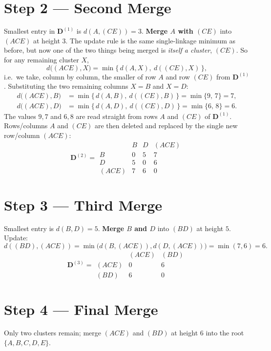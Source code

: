 \documentclass[11pt,a4paper]{report}
\theoremstyle{definition}
\theoremstyle{plain}
\theoremstyle{remark}
\begin{document}
\section{Step 2 --- Second Merge}
Smallest entry in $\mathbf D^{(1)}$ is $d(A,(CE))=3$. \textbf{Merge $A$ with
$(CE)$} into $(ACE)$ at height $3$. The update rule is the same single-linkage
minimum as before, but now one of the two things being merged is \emph{itself a
cluster}, $(CE)$. So for any remaining cluster $X$,
\[
d\bigl((ACE),X\bigr)=\min\bigl\{\,d(A,X),\ d((CE),X)\,\bigr\},
\]
i.e.\ we take, column by column, the smaller of row $A$ and row $(CE)$ from
$\mathbf D^{(1)}$. Substituting the two remaining columns $X=B$ and $X=D$:
\[
\begin{aligned}
d\bigl((ACE),B\bigr)&=\min\bigl\{\,d(A,B),\ d((CE),B)\,\bigr\}=\min\{9,\,7\}=7,\\[2pt]
d\bigl((ACE),D\bigr)&=\min\bigl\{\,d(A,D),\ d((CE),D)\,\bigr\}=\min\{6,\,8\}=6.
\end{aligned}
\]
The values $9,7$ and $6,8$ are read straight from rows $A$ and $(CE)$ of
$\mathbf D^{(1)}$. Rows/columns $A$ and $(CE)$ are then deleted and replaced by
the single new row/column $(ACE)$:
\begin{equation}
\mathbf{D}^{(2)}=
\begin{array}{c|ccc}
     & B & D & (ACE)\\ \hline
B    & 0 & 5 & 7\\
D    & 5 & 0 & 6\\
(ACE)& 7 & 6 & 0
\end{array}
\end{equation}

\section{Step 3 --- Third Merge}
Smallest entry is $d(B,D)=5$. \textbf{Merge $B$ and $D$} into $(BD)$ at height
$5$. Update:
\[
d((BD),(ACE))=\min\bigl(d(B,(ACE)),d(D,(ACE))\bigr)=\min(7,6)=6.
\]
\begin{equation}
\mathbf{D}^{(3)}=
\begin{array}{c|cc}
     & (ACE) & (BD)\\ \hline
(ACE)& 0 & 6\\
(BD) & 6 & 0
\end{array}
\end{equation}

\section{Step 4 --- Final Merge}
Only two clusters remain; merge $(ACE)$ and $(BD)$ at height $6$ into the root
$\{A,B,C,D,E\}$.
\end{document}
